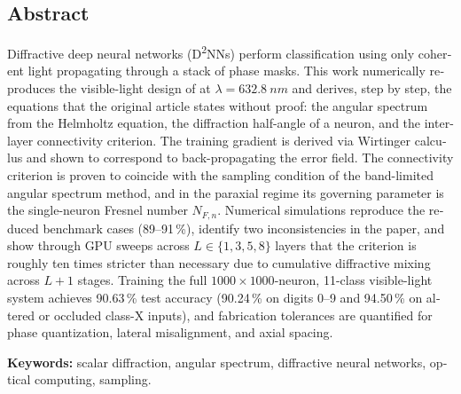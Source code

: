 \begin{otherlanguage}{english}
\chapter*{Abstract}
Diffractive deep neural networks (D\textsuperscript{2}NNs) perform classification using only
coherent light propagating through a stack of phase masks. This work numerically
reproduces the visible-light design of \textcite{chen2021} at $\lambda=\SI{632.8}{nm}$ and
derives, step by step, the equations that the original article states without proof: the
angular spectrum from the Helmholtz equation, the diffraction half-angle of a neuron, and the
inter-layer connectivity criterion. The training gradient is derived via Wirtinger calculus
and shown to correspond to back-propagating the error field. The connectivity criterion is
proven to coincide with the sampling condition of the band-limited angular spectrum method,
and in the paraxial regime its governing parameter is the single-neuron Fresnel number
$N_{F,n}$. Numerical simulations reproduce the reduced benchmark cases (89--91\,\%), identify
two inconsistencies in the paper, and show through GPU sweeps across $L\in\{1,3,5,8\}$ layers
that the criterion is roughly ten times stricter than necessary due to cumulative diffractive
mixing across $L+1$ stages. Training the full $1000\times1000$-neuron, 11-class visible-light
system achieves 90.63\,\% test accuracy (90.24\,\% on digits 0--9 and 94.50\,\% on altered or
occluded class-X inputs), and fabrication tolerances are quantified for phase quantization,
lateral misalignment, and axial spacing.

\medskip\noindent\textbf{Keywords:} scalar diffraction, angular spectrum, diffractive neural
networks, optical computing, sampling.
\end{otherlanguage}

\tableofcontents
\listoffigures
\listoftables

